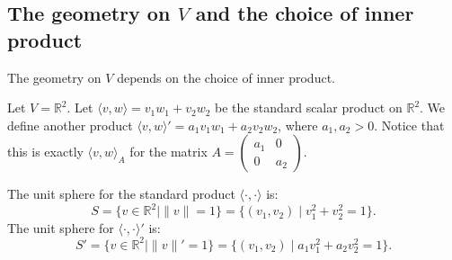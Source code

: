 \subsection{The geometry on $V$ and the choice of inner product}

The geometry on $V$ depends on the choice of inner product.

\begin{example}
    Let $V = \mathbb{R}^2$. Let $\langle v, w \rangle = v_1 w_1 + v_2 w_2$ be the standard scalar product on $\mathbb{R}^2$. 
    We define another product $\langle v, w \rangle' = a_1 v_1 w_1 + a_2 v_2 w_2$, where $a_1, a_2 > 0$. 
    Notice that this is exactly $\langle v, w \rangle_A$ for the matrix $A = \begin{pmatrix} a_1 & 0 \\ 0 & a_2 \end{pmatrix}$.
    
    The unit sphere for the standard product $\langle \cdot, \cdot \rangle$ is:
    \begin{equation*}
        S = \{v \in \mathbb{R}^2 \mid \|v\| = 1\} = \{(v_1, v_2) \mid v_1^2 + v_2^2 = 1\}.
    \end{equation*}
    The unit sphere for $\langle \cdot, \cdot \rangle'$ is:
    \begin{equation*}
        S' = \{v \in \mathbb{R}^2 \mid \|v\|' = 1\} = \{(v_1, v_2) \mid a_1 v_1^2 + a_2 v_2^2 = 1\}.
    \end{equation*}

    \begin{center}
        \begin{minipage}{0.45\textwidth}
            \centering
        \end{minipage}
        \begin{minipage}{0.45\textwidth}
            \centering
        \end{minipage}
    \end{center}
\end{example}


